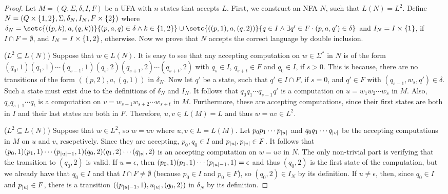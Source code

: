 \documentclass{report}
\DeclarePairedDelimiter{\set}{\{}{\}}
\DeclarePairedDelimiter{\abs}{\lvert}{\rvert}
\theoremstyle{definition}
\begin{document}
\begin{proof}
Let $M = (Q, \Sigma, \delta, I, F)$ be a UFA with $n$ states that accepts $L$.
First, we construct an NFA $N$, such that $L(N) = L^2$. Define
$N = (Q \times \set{1, 2}, \Sigma, \delta_N, I_N, F \times \set{2})$ where
$\delta_N = \setc{((p, k), a, (q, k))}{(p, a, q) \in \delta \wedge k \in \set{1, 2}}
\cup \setc{((p, 1), a, (q, 2))}{q \in I \wedge \exists q' \in F \cdot (p, a, q') \in
\delta}$ and $I_N = I \times \set{1}$, if $I \cap F = \emptyset$, and
$I_N = I \times \set{1, 2}$, otherwise. Now we prove that $N$ accepts the correct
language by double inclusion.

($L^2 \subseteq L(N)$) Suppose that $w \in L(N)$.
It is easy to see that any accepting computation on
$w \in \Sigma^{\ast}$ in $N$ is of the form $(q_0, 1) (q_1, 1) \cdots (q_{s - 1}, 1)
(q_s, 2) (q_{s + 1}, 2) \cdots (q_{s + t}, 2)$ with $q_s \in I$, $q_{s + t} \in F$
and $q_0 \in I$, if $s > 0$. This is because, there are no transitions of the form
$((p, 2), a, (q, 1))$ in $\delta_N$.
Now let $q'$ be a state, such that $q' \in I \cap F$, if $s = 0$,
and $q' \in F$ with $(q_{s - 1}, w_s, q') \in \delta$.
Such a state must exist due to the definitions of $\delta_N$ and $I_N$.
It follows that $q_0 q_1 \cdots q_{s - 1} q'$ is a computation on
$u = w_1 w_2 \cdots w_s$ in $M$. Also, $q_s q_{s + 1} \cdots q_t$ is a
computation on $v = w_{s + 1} w_{s + 2} \cdots w_{s + t}$ in $M$.
Furthermore, these are accepting computations, since their first states are both
in $I$ and their last states are both in $F$. Therefore, $u, v \in L(M) = L$ and thus
$w = uv \in L^2$.

($L^2 \subseteq L(N)$) Suppose that $w \in L^2$, so $w = uv$ where
$u, v \in L = L(M)$. Let $p_0 p_1 \cdots p_{\abs{u}}$ and
$q_0 q_1 \cdots q_{\abs{v}}$ be the accepting computations in $M$ on $u$ and $v$,
resepctively. Since they are accepting, $p_0, q_0 \in I$ and
$p_{\abs{u}}, p_{\abs{v}} \in F$.
It follows that $(p_0, 1) (p_1, 1) \cdots (p_{\abs{u} - 1}, 1) (q_0, 2) (q_1, 2)
\cdots (q_{\abs{v}}, 2)$ is an accepting computation on $w = uv$ in $N$.
The only non-trivial part is verifying that the transition to $(q_0, 2)$ is valid.
If $u = \epsilon$, then $(p_0, 1) (p_1, 1) \cdots (p_{\abs{u} - 1}, 1) = \epsilon$
and thus $(q_0, 2)$ is the first state of the computation, but we already have that
$q_0 \in I$ and that $I \cap F \neq \emptyset$ (because $p_0 \in I$ and $p_0 \in F$),
so $(q_0, 2) \in I_N$ by its definition. If $u \neq \epsilon$, then, since
$q_0 \in I$ and $p_{\abs{u}} \in F$, there is a transition
$((p_{\abs{u} - 1}, 1), u_{\abs{u}}, (q_0, 2))$ in $\delta_N$ by its definition.


\end{proof}
\end{document}

